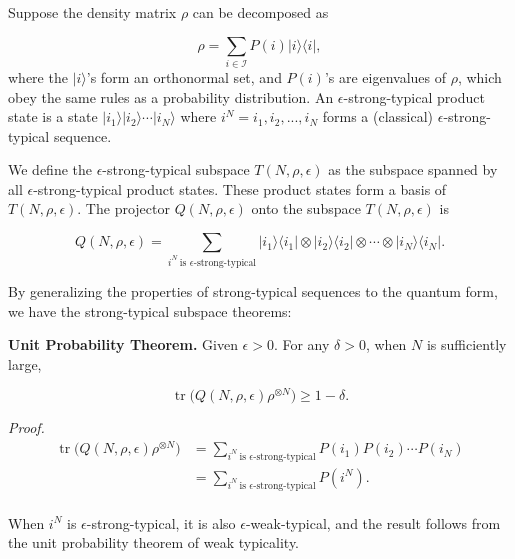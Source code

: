 \documentclass[11pt]{article}
\DeclareMathOperator{\tr}{\text{tr}}
\begin{document}
Suppose the density matrix $\rho$ can be decomposed as

\begin{equation}
    \rho = \sum_{i \in \mathcal{I}} P(i) |i\rangle \langle i|,
\end{equation}
where the $|i\rangle$'s form an orthonormal set, and $P(i)$'s are eigenvalues of $\rho$, which obey the same rules as a probability distribution. An $\epsilon$-strong-typical product state is a state $|i_1\rangle |i_2\rangle \cdots |i_N\rangle$ where $i^N = i_1, i_2, ... , i_N$ forms a (classical) $\epsilon$-strong-typical sequence.

We define the $\epsilon$-strong-typical subspace $T(N, \rho, \epsilon)$ as the subspace spanned by all $\epsilon$-strong-typical product states. These product states form a basis of $T(N, \rho, \epsilon)$. The projector $Q(N, \rho, \epsilon)$ onto the subspace $T(N, \rho, \epsilon)$ is

\begin{equation}
    Q(N, \rho, \epsilon) = \sum_{i^N \ \text{is }  \epsilon \text{-strong-typical}} 
    |i_1\rangle \langle i_1| \otimes
|i_2\rangle \langle i_2| \otimes \cdots \otimes
|i_N\rangle \langle i_N|.
\end{equation}

By generalizing the properties of strong-typical sequences to the quantum form, we have the strong-typical subspace theorems:

\textbf{Unit Probability Theorem.} Given $\epsilon > 0$. For any $\delta > 0$, when $N$ is sufficiently large,

\begin{equation}
    \tr \big( Q(N, \rho, \epsilon) \rho^{\otimes N} \big)
    \geq 1 - \delta.
\end{equation}

\textit{Proof.} 
\begin{equation}
\begin{split}
    \tr \big( Q(N, \rho, \epsilon) \rho^{\otimes N} \big)
&= \sum_{i^N \ \text{is }  \epsilon \text{-strong-typical}} P(i_1) P(i_2) \cdots P(i_N) \\
&=  \sum_{i^N \ \text{is }  \epsilon \text{-strong-typical}}  P(i^N). \\
\end{split}
\end{equation}

When $i^N$ is $\epsilon$-strong-typical, it is also $\epsilon$-weak-typical, and the result follows from the unit probability theorem of weak typicality.
\end{document}
